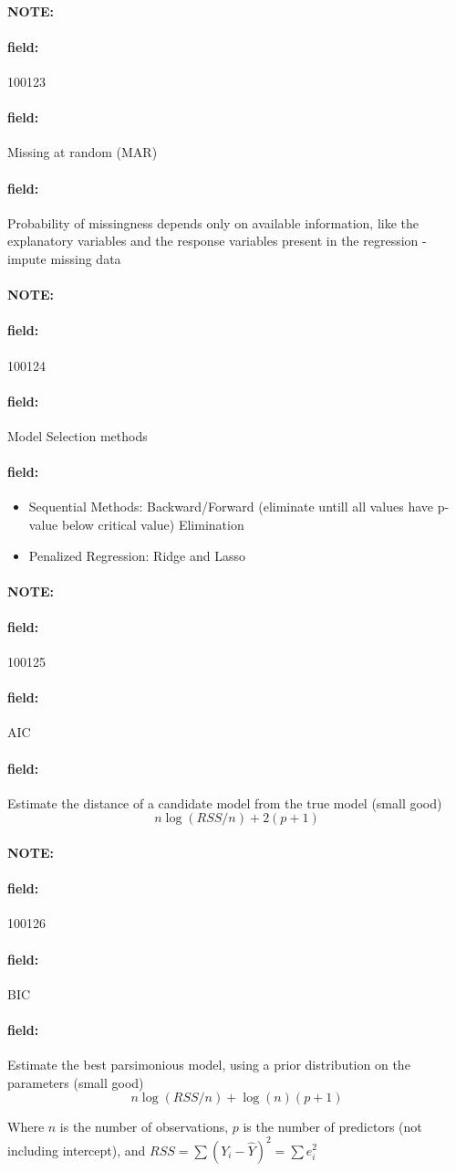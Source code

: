 \documentclass[12pt]{article}
\newenvironment{note}{\paragraph{NOTE:}}{}
\newenvironment{field}{\paragraph{field:}}{}
\begin{document}
\begin{note} \begin{field} \tiny 100123 \end{field}
  \begin{field}
    Missing at random (MAR)
  \end{field}
  \begin{field}
    Probability of missingness depends only on available information, like the explanatory variables and the response variables present in the regression - impute missing data
  \end{field}
\end{note}

\begin{note} \begin{field} \tiny 100124 \end{field}
  \begin{field}
    Model Selection methods
  \end{field}
  \begin{field}
    \begin{itemize}
      \item Sequential Methods: Backward/Forward (eliminate untill all values have p-value below critical value) Elimination
      \item Penalized Regression: Ridge and Lasso
    \end{itemize}
  \end{field}
\end{note}

\begin{note} \begin{field} \tiny 100125 \end{field}
  \begin{field}
    AIC
  \end{field}
  \begin{field}
    Estimate the distance of a candidate model from the true model (small good)
    $$ n \log (RSS/n) + 2(p+1)$$
  \end{field}
\end{note}


\begin{note} \begin{field} \tiny 100126 \end{field}
  \begin{field}
    BIC
  \end{field}
  \begin{field}
    Estimate the best parsimonious model, using a prior distribution on the parameters (small good)
    $$  n \log (RSS/n) + \log(n)(p+1)$$

    Where $n$ is the number of observations, $p$ is the number of predictors (not including intercept), and $RSS = \sum (Y_i - \hat{Y})^2 = \sum e_i^2 $
  \end{field}
\end{note}
\end{document}
